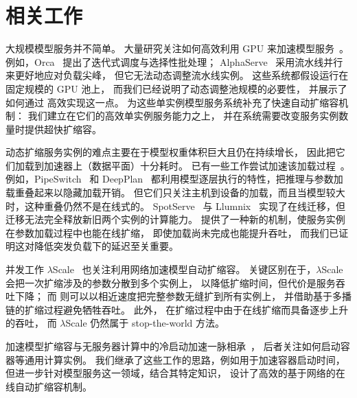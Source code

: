 \section{相关工作}
\label{sec:related}

大规模模型服务并不简单。
大量研究关注如何高效利用 GPU 来加速模型服务~\cite{DBLP:conf/osdi/ZhongLCHZL0024,DBLP:journals/corr/abs-2404-09526,vllm,alpaserve,DBLP:conf/osdi/YuJKKC22,DBLP:conf/isca/PatelCZSGMB24,298501,kvcache}。
例如，Orca~\cite{DBLP:conf/osdi/YuJKKC22} 提出了迭代式调度与选择性批处理；
AlphaServe~\cite{alpaserve} 采用流水线并行来更好地应对负载尖峰，
但它无法动态调整流水线实例。
这些系统都假设运行在固定规模的 GPU 池上，
而我们已经说明了动态调整池规模的必要性，
并展示了如何通过 {\sys} 高效实现这一点。
{\sys} 为这些单实例模型服务系统补充了快速自动扩缩容机制：
我们建立在它们的高效单实例服务能力之上，
并在系统需要改变服务实例数量时提供超快扩缩容。

动态扩缩服务实例的难点主要在于模型权重体积巨大且仍在持续增长，
因此把它们加载到加速器上（数据平面）十分耗时。
已有一些工作尝试加速该加载过程~\cite{pipeswitch, DBLP:conf/eurosys/JeongBA23, DBLP:conf/asplos/MiaoSDXL0J24, DBLP:conf/osdi/SunHZXZL024}。
例如，PipeSwitch~\cite{pipeswitch} 和 DeepPlan~\cite{DBLP:conf/eurosys/JeongBA23}
都利用模型逐层执行的特性，把推理与参数加载重叠起来以隐藏加载开销。
但它们只关注主机到设备的加载，而且当模型较大时，这种重叠仍然不是在线式的。
SpotServe~\cite{DBLP:conf/asplos/MiaoSDXL0J24} 与 Llumnix~\cite{DBLP:conf/osdi/SunHZXZL024}
实现了在线迁移，但迁移无法完全释放新旧两个实例的计算能力。
{\sys} 提供了一种新的机制，使服务实例在参数加载过程中也能在线扩缩，
即使加载尚未完成也能提升吞吐，
而我们已证明这对降低突发负载下的延迟至关重要。

并发工作 $\lambda$Scale~\cite{yu2025lambdascale} 也关注利用网络加速模型自动扩缩容。
关键区别在于，$\lambda$Scale 会把一次扩缩涉及的参数分散到多个实例上，
以降低扩缩时间，但代价是服务吞吐下降；
而 {\sys} 则可以以相近速度把完整参数无缝扩到所有实例上，
并借助基于多播链的扩缩过程避免牺牲吞吐。
此外，{\sys} 在扩缩过程中由于在线扩缩而具备逐步上升的吞吐，
而 $\lambda$Scale 仍然属于 stop-the-world 方法。

加速模型扩缩容与无服务器计算中的冷启动加速一脉相承~\cite{sock,sand,FAASM,DBLP:conf/asplos/DuYXZYQWC20,DBLP:conf/asplos/Ustiugov0KBG21,DBLP:conf/eurosys/SaxenaJSKA22,DBLP:conf/usenix/WangCTWYLDC21}，
后者关注如何启动容器等通用计算实例。
我们继承了这些工作的思路，例如用于加速容器启动时间，
但进一步针对模型服务这一领域，结合其特定知识，
设计了高效的基于网络的在线自动扩缩容机制。
